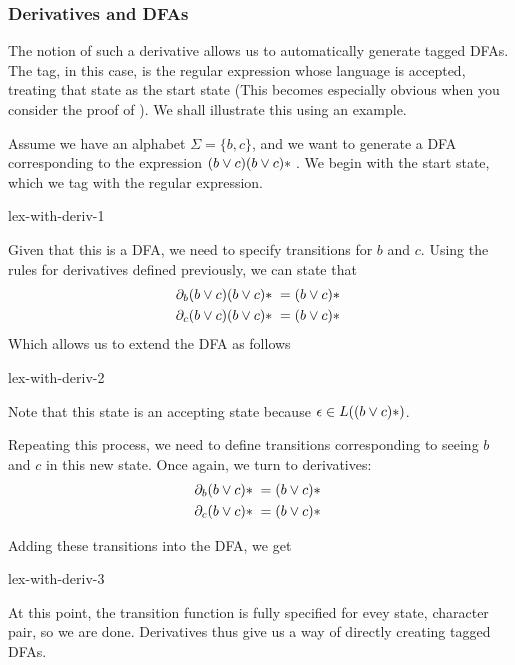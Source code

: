 \subsubsection{Derivatives and DFAs}
The notion of such a derivative allows us to automatically generate tagged DFAs. The tag, in this case, is the regular expression whose language is accepted, treating that state as the start state (This becomes especially obvious when you consider the proof of ). We shall illustrate this using an example. 

Assume we have an alphabet $\Sigma = \{ b, c\}$, and we want to generate a DFA corresponding to the expression $(b \lor c)(b\lor c)\*$. We begin with the start state, which we tag with the regular expression. 

\begin{center}
    {lex-with-deriv-1}
\end{center}

Given that this is a DFA, we need to specify transitions for $b$ and $c$. Using the rules for derivatives defined previously, we can state that 
\begin{align*}
    \partial_b (b \lor c)(b \lor c)\* = (b \lor c)\*\\
    \partial_c (b \lor c)(b \lor c)\* = (b \lor c)\*
\end{align*}
Which allows us to extend the DFA as follows

\begin{center}
    {lex-with-deriv-2}
\end{center}
Note that this state is an accepting state because $\epsilon \in L((b \lor c)\*)$. 

Repeating this process, we need to define transitions corresponding to seeing $b$ and $c$ in this new state. Once again, we turn to derivatives:
\begin{align*}
    \partial_b (b \lor c)\* = (b \lor c)\*\\
    \partial_c (b \lor c)\* = (b \lor c)\*
\end{align*}

Adding these transitions into the DFA, we get

\begin{center}
    {lex-with-deriv-3}
\end{center}

At this point, the transition function is fully specified for evey state, character pair, so we are done. Derivatives thus give us a way of directly creating tagged DFAs.

